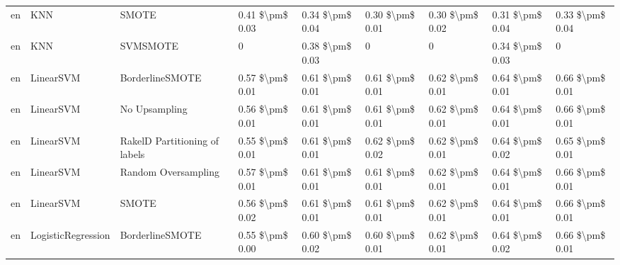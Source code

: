 \begin{tabular}{lllllllll}
      en &                             KNN &                         SMOTE & 0.41 \$\textbackslash pm\$ 0.03 &           0.34 \$\textbackslash pm\$ 0.04 &       0.30 \$\textbackslash pm\$ 0.01 &        0.30 \$\textbackslash pm\$ 0.02 &                         0.31 \$\textbackslash pm\$ 0.04 &     0.33 \$\textbackslash pm\$ 0.04 \\
      en &                             KNN &                      SVMSMOTE &               0 &           0.38 \$\textbackslash pm\$ 0.03 &                     0 &                      0 &                         0.34 \$\textbackslash pm\$ 0.03 &                   0 \\
      en &                       LinearSVM &               BorderlineSMOTE & 0.57 \$\textbackslash pm\$ 0.01 &           0.61 \$\textbackslash pm\$ 0.01 &       0.61 \$\textbackslash pm\$ 0.01 &        0.62 \$\textbackslash pm\$ 0.01 &                         0.64 \$\textbackslash pm\$ 0.01 &     0.66 \$\textbackslash pm\$ 0.01 \\
      en &                       LinearSVM &                 No Upsampling & 0.56 \$\textbackslash pm\$ 0.01 &           0.61 \$\textbackslash pm\$ 0.01 &       0.61 \$\textbackslash pm\$ 0.01 &        0.62 \$\textbackslash pm\$ 0.01 &                         0.64 \$\textbackslash pm\$ 0.01 &     0.66 \$\textbackslash pm\$ 0.01 \\
      en &                       LinearSVM & RakelD Partitioning of labels & 0.55 \$\textbackslash pm\$ 0.01 &           0.61 \$\textbackslash pm\$ 0.01 &       0.62 \$\textbackslash pm\$ 0.02 &        0.62 \$\textbackslash pm\$ 0.01 &                         0.64 \$\textbackslash pm\$ 0.02 &     0.65 \$\textbackslash pm\$ 0.01 \\
      en &                       LinearSVM &           Random Oversampling & 0.57 \$\textbackslash pm\$ 0.01 &           0.61 \$\textbackslash pm\$ 0.01 &       0.61 \$\textbackslash pm\$ 0.01 &        0.62 \$\textbackslash pm\$ 0.01 &                         0.64 \$\textbackslash pm\$ 0.01 &     0.66 \$\textbackslash pm\$ 0.01 \\
      en &                       LinearSVM &                         SMOTE & 0.56 \$\textbackslash pm\$ 0.02 &           0.61 \$\textbackslash pm\$ 0.01 &       0.61 \$\textbackslash pm\$ 0.01 &        0.62 \$\textbackslash pm\$ 0.01 &                         0.64 \$\textbackslash pm\$ 0.01 &     0.66 \$\textbackslash pm\$ 0.01 \\
      en &              LogisticRegression &               BorderlineSMOTE & 0.55 \$\textbackslash pm\$ 0.00 &           0.60 \$\textbackslash pm\$ 0.02 &       0.60 \$\textbackslash pm\$ 0.01 &        0.62 \$\textbackslash pm\$ 0.01 &                         0.64 \$\textbackslash pm\$ 0.02 &     0.66 \$\textbackslash pm\$ 0.01 \\

\end{tabular}

